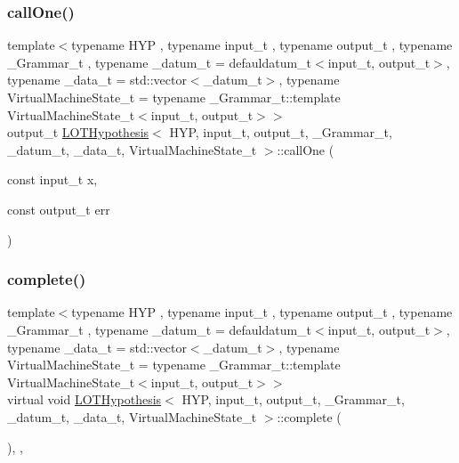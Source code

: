 \mbox{\label{class_l_o_t_hypothesis_a834197767cb83a17c6b3eb564e11a3b2}} 
\subsubsection{\texorpdfstring{call\+One()}{callOne()}\hspace{0.1cm}{\footnotesize\ttfamily [2/2]}}
{\footnotesize\ttfamily template$<$typename H\+YP , typename input\+\_\+t , typename output\+\_\+t , typename \+\_\+\+Grammar\+\_\+t , typename \+\_\+datum\+\_\+t  = defauldatum\+\_\+t$<$input\+\_\+t, output\+\_\+t$>$, typename \+\_\+data\+\_\+t  = std\+::vector$<$\+\_\+datum\+\_\+t$>$, typename Virtual\+Machine\+State\+\_\+t  = typename \+\_\+\+Grammar\+\_\+t\+::template Virtual\+Machine\+State\+\_\+t$<$input\+\_\+t, output\+\_\+t$>$$>$ \\
output\+\_\+t \hyperlink{class_l_o_t_hypothesis}{L\+O\+T\+Hypothesis}$<$ H\+YP, input\+\_\+t, output\+\_\+t, \+\_\+\+Grammar\+\_\+t, \+\_\+datum\+\_\+t, \+\_\+data\+\_\+t, Virtual\+Machine\+State\+\_\+t $>$\+::call\+One (\begin{DoxyParamCaption}\item[{const input\+\_\+t}]{x,  }\item[{const output\+\_\+t}]{err }\end{DoxyParamCaption})\hspace{0.3cm}{\ttfamily [inline]}}

\mbox{\label{class_l_o_t_hypothesis_a7f913b702b434003f94a84c560d16bf9}} 
\subsubsection{\texorpdfstring{complete()}{complete()}}
{\footnotesize\ttfamily template$<$typename H\+YP , typename input\+\_\+t , typename output\+\_\+t , typename \+\_\+\+Grammar\+\_\+t , typename \+\_\+datum\+\_\+t  = defauldatum\+\_\+t$<$input\+\_\+t, output\+\_\+t$>$, typename \+\_\+data\+\_\+t  = std\+::vector$<$\+\_\+datum\+\_\+t$>$, typename Virtual\+Machine\+State\+\_\+t  = typename \+\_\+\+Grammar\+\_\+t\+::template Virtual\+Machine\+State\+\_\+t$<$input\+\_\+t, output\+\_\+t$>$$>$ \\
virtual void \hyperlink{class_l_o_t_hypothesis}{L\+O\+T\+Hypothesis}$<$ H\+YP, input\+\_\+t, output\+\_\+t, \+\_\+\+Grammar\+\_\+t, \+\_\+datum\+\_\+t, \+\_\+data\+\_\+t, Virtual\+Machine\+State\+\_\+t $>$\+::complete (\begin{DoxyParamCaption}{ }\end{DoxyParamCaption})\hspace{0.3cm}{\ttfamily [inline]}, {\ttfamily [override]}, {\ttfamily [virtual]}}



